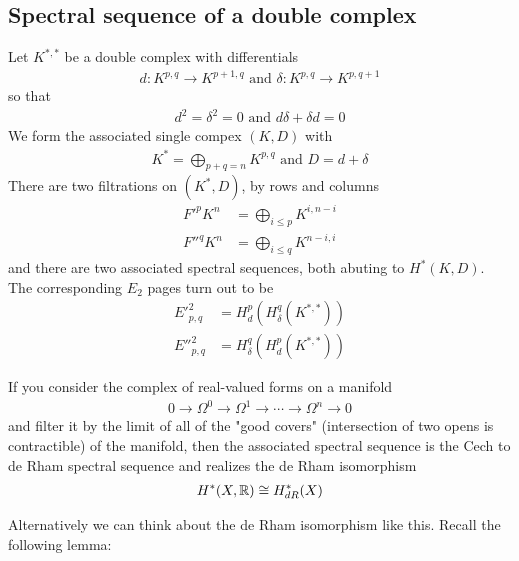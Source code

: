 \documentclass[12pt]{article}
\begin{document}
\subsection{Spectral sequence of a double complex}
Let $K^{*,*}$ be a double complex with differentials \begin{align*}
    d: K^{p,q} \to K^{p+1,q} \text{ and } \delta: K^{p,q} \to K^{p,q+1}
\end{align*} so that \begin{align*}
    d^2 = \delta^2 = 0 \text{ and } d\delta + \delta d = 0
\end{align*} We form the associated single compex $(K,D)$ with \begin{align*}
    K^* = \bigoplus_{p+q=n} K^{p,q} \text{ and } D = d + \delta
\end{align*}
There are two filtrations on $(K^*,D)$, by rows and columns \begin{align*}
    F'^pK^n &= \bigoplus_{i\leq p} K^{i,n-i} \\
    F''^qK^n &= \bigoplus_{i\leq q} K^{n-i,i}
\end{align*} and there are two associated spectral sequences, both abuting to 
$H^*(K,D)$. The corresponding $E_2$ pages turn out to be \begin{align*}
    E'^2_{p,q} &= H^p_d(H^q_\delta(K^{*,*})) \\
    E''^2_{p,q} &= H^q_\delta(H^p_d(K^{*,*}))
\end{align*}
\begin{example}
    If you consider the complex of real-valued forms on a manifold \begin{align*}
        0 \to \Omega^0 \to \Omega^1 \to \cdots \to \Omega^n \to 0
    \end{align*} and filter it by the limit of all of the "good covers" (intersection 
    of two opens is contractible) of the manifold, 
    then the associated spectral sequence is the Cech to de Rham spectral sequence and
    realizes the de Rham isomorphism \begin{align*}
        H^*(X,\mathbb{R}) \cong H^*_{dR}(X)
    \end{align*}
\end{example}
Alternatively we can think about the de Rham isomorphism like this. Recall the 
following lemma:
\end{document}
